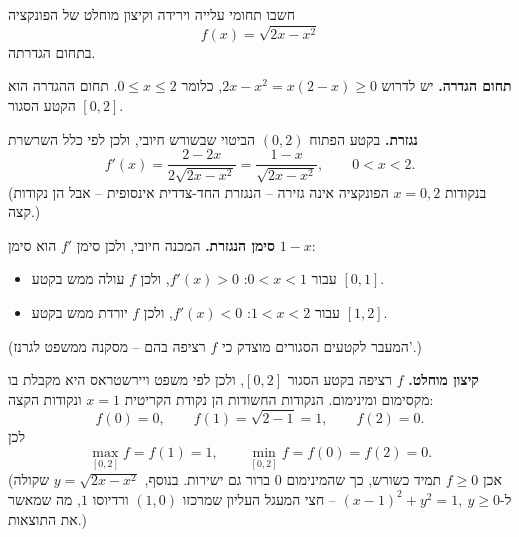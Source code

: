 
\begin{question}
חשבו תחומי עלייה וירידה וקיצון מוחלט של הפונקציה
\[ f(x)=\sqrt{2x-x^2} \]
בתחום הגדרתה.
\end{question}

\begin{solution}
\textbf{תחום הגדרה.} יש לדרוש $2x-x^2=x(2-x)\ge0$, כלומר $0\le x\le 2$. תחום ההגדרה הוא הקטע הסגור $[0,2]$.

\textbf{נגזרת.} בקטע הפתוח $(0,2)$ הביטוי שבשורש חיובי, ולכן לפי כלל השרשרת
\[ f'(x)=\frac{2-2x}{2\sqrt{2x-x^2}}=\frac{1-x}{\sqrt{2x-x^2}},\qquad 0<x<2. \]
(בנקודות $x=0,2$ הפונקציה אינה גזירה – הנגזרת החד-צדדית אינסופית – אבל הן נקודות קצה.)

\textbf{סימן הנגזרת.} המכנה חיובי, ולכן סימן $f'$ הוא סימן $1-x$:
\begin{itemize}
  \item עבור $0<x<1$: $f'(x)>0$, ולכן $f$ עולה ממש בקטע $[0,1]$.
  \item עבור $1<x<2$: $f'(x)<0$, ולכן $f$ יורדת ממש בקטע $[1,2]$.
\end{itemize}
(המעבר לקטעים הסגורים מוצדק כי $f$ רציפה בהם – מסקנה ממשפט לגרנז'.)

\textbf{קיצון מוחלט.} $f$ רציפה בקטע הסגור $[0,2]$, ולכן לפי משפט ויירשטראס היא מקבלת בו מקסימום ומינימום. הנקודות החשודות הן נקודת הקריטית $x=1$ ונקודות הקצה:
\[ f(0)=0,\qquad f(1)=\sqrt{2-1}=1,\qquad f(2)=0. \]
לכן
\[ \boxed{\max_{[0,2]}f=f(1)=1,\qquad \min_{[0,2]}f=f(0)=f(2)=0.} \]
(אכן $f\ge0$ תמיד כשורש, כך שהמינימום $0$ ברור גם ישירות. בנוסף, $y=\sqrt{2x-x^2}$ שקולה ל-$(x-1)^2+y^2=1,\ y\ge0$ – חצי המעגל העליון שמרכזו $(1,0)$ ורדיוסו $1$, מה שמאשר את התוצאות.)
\end{solution}
